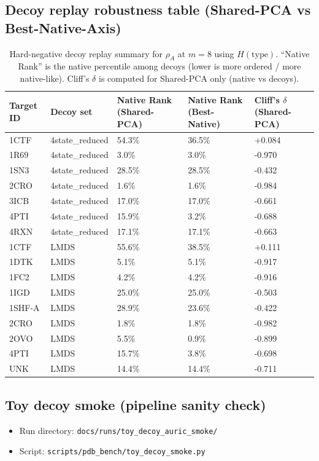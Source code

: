\subsection*{Decoy replay robustness table (Shared-PCA vs Best-Native-Axis)}
\begin{table}[t]
  \centering
  \caption{Hard-negative decoy replay summary for $\rho_A$ at $m=8$ using $H(\mathrm{type})$. ``Native Rank'' is the native percentile among decoys (lower is more ordered / more native-like). Cliff's $\delta$ is computed for Shared-PCA only (native vs decoys).}
  \label{tab:decoy_replay_axis_ablation}
  \scriptsize
  \setlength{\tabcolsep}{4pt}
  \begin{tabular}{lllll}
    \toprule
    Target ID & Decoy set & Native Rank (Shared-PCA) & Native Rank (Best-Native) & Cliff's $\delta$ (Shared-PCA) \\
    \midrule
    1CTF & 4state\_reduced & 54.3\% & 36.5\% & +0.084 \\
    1R69 & 4state\_reduced & 3.0\% & 3.0\% & -0.970 \\
    1SN3 & 4state\_reduced & 28.5\% & 28.5\% & -0.432 \\
    2CRO & 4state\_reduced & 1.6\% & 1.6\% & -0.984 \\
    3ICB & 4state\_reduced & 17.0\% & 17.0\% & -0.661 \\
    4PTI & 4state\_reduced & 15.9\% & 3.2\% & -0.688 \\
    4RXN & 4state\_reduced & 17.1\% & 17.1\% & -0.663 \\
    \midrule
    1CTF & LMDS & 55.6\% & 38.5\% & +0.111 \\
    1DTK & LMDS & 5.1\% & 5.1\% & -0.917 \\
    1FC2 & LMDS & 4.2\% & 4.2\% & -0.916 \\
    1IGD & LMDS & 25.0\% & 25.0\% & -0.503 \\
    1SHF-A & LMDS & 28.9\% & 23.6\% & -0.422 \\
    2CRO & LMDS & 1.8\% & 1.8\% & -0.982 \\
    2OVO & LMDS & 5.5\% & 0.9\% & -0.899 \\
    4PTI & LMDS & 15.7\% & 3.8\% & -0.698 \\
    UNK & LMDS & 14.4\% & 14.4\% & -0.711 \\
    \bottomrule
  \end{tabular}
\end{table}

\subsection*{Toy decoy smoke (pipeline sanity check)}
\begin{itemize}
  \item Run directory: \texttt{docs/runs/toy\_decoy\_auric\_smoke/}
  \item Script: \texttt{scripts/pdb\_bench/toy\_decoy\_smoke.py}
\end{itemize}

